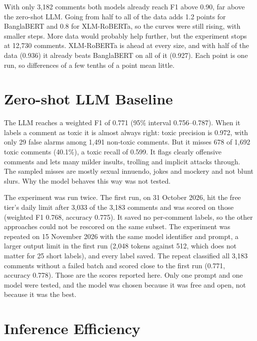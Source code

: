With only 3,182 comments both models already reach F1 above 0.90, far above the zero-shot LLM. Going from half to all of the data adds 1.2 points for BanglaBERT and 0.8 for XLM-RoBERTa, so the curves were still rising, with smaller steps. More data would probably help further, but the experiment stops at 12,730 comments. XLM-RoBERTa is ahead at every size, and with half of the data (0.936) it already beats BanglaBERT on all of it (0.927). Each point is one run, so differences of a few tenths of a point mean little.

\section{Zero-shot LLM Baseline}
\label{sec:llm}

The LLM reaches a weighted F1 of 0.771 (95\% interval 0.756--0.787). When it labels a comment as toxic it is almost always right: toxic precision is 0.972, with only 29 false alarms among 1,491 non-toxic comments. But it misses 678 of 1,692 toxic comments (40.1\%), a toxic recall of 0.599. It flags clearly offensive comments and lets many milder insults, trolling and implicit attacks through. The sampled misses are mostly sexual innuendo, jokes and mockery and not blunt slurs. Why the model behaves this way was not tested.

The experiment was run twice. The first run, on 31 October 2026, hit the free tier's daily limit after 3,033 of the 3,183 comments and was scored on those (weighted F1 0.768, accuracy 0.775). It saved no per-comment labels, so the other approaches could not be rescored on the same subset. The experiment was repeated on 15 November 2026 with the same model identifier and prompt, a larger output limit in the first run (2,048 tokens against 512, which does not matter for 25 short labels), and every label saved. The repeat classified all 3,183 comments without a failed batch and scored close to the first run (0.771, accuracy 0.778). Those are the scores reported here. Only one prompt and one model were tested, and the model was chosen because it was free and open, not because it was the best.

\section{Inference Efficiency}
\label{sec:speed}

